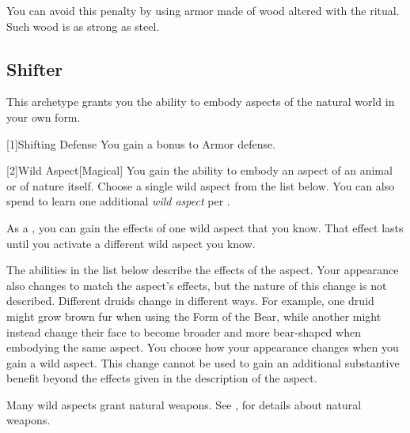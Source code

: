         You can avoid this penalty by using armor made of wood altered with the  ritual.
        Such wood is as strong as steel.

    \subsection{Shifter}\label{Shifter}
        This archetype grants you the ability to embody aspects of the natural world in your own form.

        [1]{Shifting Defense} You gain a  bonus to Armor defense.

        [2]{Wild Aspect}[Magical]
        You gain the ability to embody an aspect of an animal or of nature itself.
        Choose a single wild aspect from the list below.
        You can also spend  to learn one additional \textit{wild aspect} per .

        As a , you can gain the effects of one wild aspect that you know.
        That effect lasts until you activate a different wild aspect you know.

        The abilities in the list below describe the effects of the aspect.
        Your appearance also changes to match the aspect's effects, but the nature of this change is not described.
        Different druids change in different ways.
        For example, one druid might grow brown fur when using the Form of the Bear, while another might instead change their face to become broader and more bear-shaped when embodying the same aspect.
        You choose how your appearance changes when you gain a wild aspect.
        This change cannot be used to gain an additional substantive benefit beyond the effects given in the description of the aspect.

        Many wild aspects grant natural weapons.
        See , for details about natural weapons.

